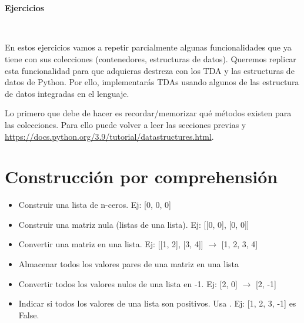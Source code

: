 


\


\


\centerline{\Large \bf Ejercicios}


\formatoEjercicio



\

En estos ejercicios vamos a repetir parcialmente algunas funcionalidades que ya tiene  con sus colecciones (contenedores, estructuras de datos).  Queremos replicar esta funcionalidad para que adquieras destreza con los TDA y las estructuras de datos de Python. Por ello, implementarás  TDAs usando algunos de las estructura de datos integradas en el lenguaje. 

Lo primero que debe de hacer es recordar/memorizar qué métodos existen para las colecciones. Para ello puede volver a leer las secciones previas y \url{https://docs.python.org/3.9/tutorial/datastructures.html}.



\separacion
\section{Construcción por comprehensión}\label{sec:ejercComprehension}

\begin{itemize}

\item Construir una lista de n-ceros. Ej: [0, 0, 0]
\item Construir una matriz nula (listas de una lista). Ej: [[0, 0], [0, 0]]
\item Convertir una matriz en una lista. Ej: [[1, 2], [3, 4]] $\rightarrow$ [1, 2, 3, 4]
\item Almacenar todos los valores pares de una matriz en una lista
\item Convertir todos los valores nulos de una lista en -1. Ej: [2, 0] $\rightarrow$ [2, -1]
\item Indicar si todos los valores de una  lista son positivos. Usa . Ej: [1, 2, 3, -1] es False.
\end{itemize}



